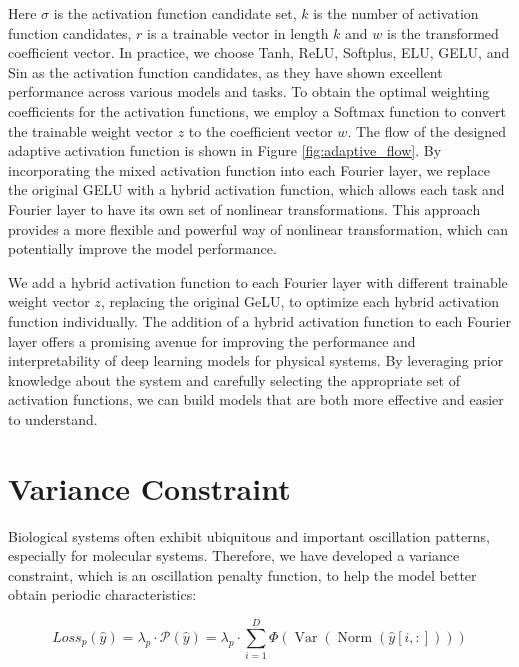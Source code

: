 Here $\sigma$ is the activation function candidate set, $k$ is the number of activation function candidates, $r$ is a trainable vector in length $k$ and $w$ is the transformed coefficient vector. In practice, we choose Tanh, ReLU, Softplus, ELU, GELU, and Sin as the activation function candidates, as they have shown excellent performance across various models and tasks. To obtain the optimal weighting coefficients for the activation functions, we employ a Softmax function to convert the trainable weight vector $z$ to the coefficient vector $w$. The flow of the designed adaptive activation function is shown in Figure \ref{fig:adaptive_flow}. By incorporating the mixed activation function into each Fourier layer, we replace the original GELU with a hybrid activation function, which allows each task and Fourier layer to have its own set of nonlinear transformations. This approach provides a more flexible and powerful way of nonlinear transformation, which can potentially improve the model performance.

We add a hybrid activation function to each Fourier layer with different trainable weight vector $z$, replacing the original GeLU, to optimize each hybrid activation function individually. The addition of a hybrid activation function to each Fourier layer offers a promising avenue for improving the performance and interpretability of deep learning models for physical systems. By leveraging prior knowledge about the system and carefully selecting the appropriate set of activation functions, we can build models that are both more effective and easier to understand.


\section{Variance Constraint}
\label{cha:cyclic}

Biological systems often exhibit ubiquitous and important oscillation patterns, especially for molecular systems. Therefore, we have developed a variance constraint, which is an oscillation penalty function, to help the model better obtain periodic characteristics:

\begin{equation}
Loss_{p}\left(\widehat{y}\right)=\lambda_{p}\cdot \mathcal{P}\left(\widehat{y}\right)=\lambda_{p}\cdot \sum^{D}_{i=1} \Phi\left(\operatorname{Var} \left( \operatorname{Norm} \left(\widehat{y}[i,:]\right)\right)\right)
\end{equation}

